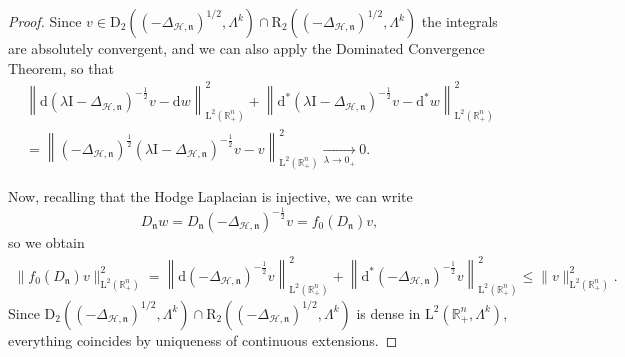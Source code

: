 \documentclass[10pt]{amsart}
\theoremstyle{definition}\newtheorem{defi}[theo]{Definition}\newtheorem{rema}[theo]{Remark}\newtheorem{exam}[theo]{Example}\newtheorem{exem}[theo]{Example}\newtheorem{nota}[theo]{Notation}
\newcommand{\bbR}{\mathbb{R}}
\newcommand{\rmd}{\mathrm{d}}
\newcommand{\rmD}{\mathrm{D}}
\newcommand{\rmL}{\mathrm{L}}
\newcommand{\rmR}{\mathrm{R}}
\newcommand{\rmI}{\mathrm{I}}
\newcommand{\clH}{\mathcal{H}}
\newcommand{\fkn}{\mathfrak{n}}
\begin{document}
\begin{proof}
Since $v\in\rmD_2((-\Delta_{\clH,\fkn})^{1/2},\Lambda^k)\cap\rmR _2((-\Delta_{\clH,\fkn})^{1/2},\Lambda^k)$ the integrals are absolutely convergent, and we can also apply the Dominated Convergence Theorem, so that
\begin{multline}\label{eqref:resolvConvSquareRootL2}
\left\| \rmd\left(\lambda\rmI -\Delta_{\clH,\fkn}\right)^{-\frac{1}{2}} v -\rmd w\right\|_{\rmL^2\left(\bbR^n_+\right)}^2+\left\| \rmd^\ast\left(\lambda\rmI -\Delta_{\clH,\fkn}\right)^{-\frac{1}{2}} v -\rmd^\ast w\right\|_{\rmL^2\left(\bbR^n_+\right)}^2\\
=\left\| \left(-\Delta_{\clH,\fkn}\right)^{\frac{1}{2}}\left(\lambda\rmI -\Delta_{\clH,\fkn}\right)^{-\frac{1}{2}} v -v\right\|_{\rmL^2\left(\bbR^n_+\right)}^2 \xrightarrow[\lambda \rightarrow 0_+]{}0.
\end{multline}

Now, recalling that the Hodge Laplacian is injective, we can write
\[
D_{\fkn}w= D_{\fkn}\left(-\Delta_{\clH,\fkn}\right)^{-\frac{1}{2}}v = f_0(D_{\fkn})v,
\]
so we obtain
\begin{align*}
\| f_0(D_\fkn)v\|_{\rmL^2\left(\bbR^n_+\right)}^2 = \left\| \rmd\left(-\Delta_{\clH,\fkn}\right)^{-\frac{1}{2}} v \right\|_{\rmL^2\left(\bbR^n_+\right)}^2+\left\| \rmd^\ast\left(-\Delta_{\clH,\fkn}\right)^{-\frac{1}{2}} v\right\|_{\rmL^2\left(\bbR^n_+\right)}^2 \leqslant \| v \|_{\rmL^2\left(\bbR^n_+\right)}^2.
\end{align*}
Since $\rmD_2((-\Delta_{\clH,\fkn})^{1/2},\Lambda^k)\cap\rmR_2((-\Delta_{\clH,\fkn})^{1/2},\Lambda^k)$ is dense in $\rmL^2(\bbR^n_+,\Lambda^k)$, everything coincides by uniqueness of continuous extensions.


\end{proof}
\end{document}
